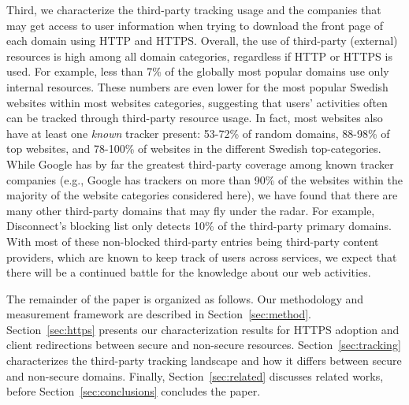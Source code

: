 \documentclass[letterpaper]{sig-alternate-10pt}
\begin{document}
Third, we characterize the third-party tracking usage and the companies that may get access 
to user information when trying to download the front page of each domain 
using HTTP and HTTPS.  Overall, the use of third-party (external) 
resources is high among all domain categories, regardless if HTTP or HTTPS is used.  
For example, less than 7\% of the globally most popular domains use only internal resources.  
These numbers are even lower for the most popular Swedish websites within most websites categories, 
suggesting that users' activities often can be tracked 
through third-party resource usage.  In fact, most websites also have at least one {\em known} 
tracker present: 53-72\% of random domains, 88-98\% of top websites, and 78-100\% of websites 
in the different Swedish top-categories.  While Google has by far the greatest third-party 
coverage among known tracker companies (e.g., Google has trackers on more than 90\% of the 
websites within the majority of the website categories considered here), we have found that 
there are many other third-party domains that may fly under the radar.  
For example, Disconnect's blocking list only detects 10\% of the 
third-party primary domains.  
With most of these non-blocked third-party entries being third-party content providers, which are 
known to keep track of users across services, we expect that there will be a continued 
battle for the knowledge about our web activities.

The remainder of the paper is organized as follows. 
Our methodology and measurement framework are 
described in Section~\ref{sec:method}.  Section~\ref{sec:https} presents our 
characterization results for HTTPS adoption and client redirections between 
secure and non-secure resources.  Section~\ref{sec:tracking} characterizes the 
third-party tracking landscape and how it differs between secure and non-secure 
domains. Finally, Section~\ref{sec:related} discusses related works, before 
Section~\ref{sec:conclusions} concludes the paper.

\end{document}
